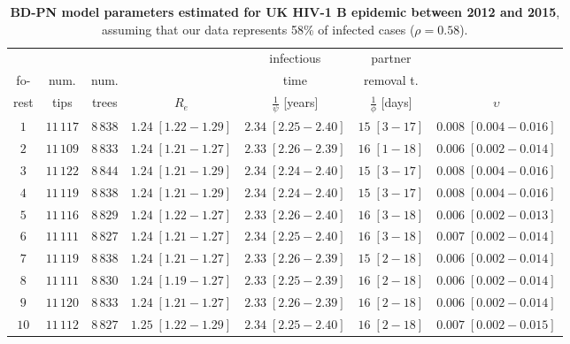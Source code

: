 \documentclass[10pt,letterpaper]{article}
\begin{document}
\begin{table}[!ht]
\begin{adjustwidth}{-0.8in}{0in} %
\centering
\caption{
{\bf BD-PN model parameters estimated for UK HIV-1 B epidemic between 2012 and 2015}, assuming that our data represents 58\% of infected cases ($\rho=0.58$).}

\begin{tabular}{c|cc|cccc}
&&&&infectious&partner&\\
fo-&num.&num.&&time&removal t.&\\
rest&tips&trees&$R_e$&$\frac{1}{\psi}$ [years]& $\frac{1}{\phi}$ [days]&$\upsilon$\\
\toprule
  $1$ & $11\,117$ & $8\,838$ & $1.24\;[1.22-1.29]$& $2.34\;[2.25-2.40]$& $15\;[3-17]$& $0.008\;[0.004-0.016]$ \\
 $2$ & $11\,109$ & $8\,833$ & $1.24\;[1.21-1.27]$& $2.33\;[2.26-2.39]$& $16\;[1-18]$& $0.006\;[0.002-0.014]$ \\
 $3$ & $11\,122$ & $8\,844$ & $1.24\;[1.21-1.29]$& $2.34\;[2.24-2.40]$& $15\;[3-17]$& $0.008\;[0.004-0.016]$ \\
 $4$ & $11\,119$ & $8\,838$ & $1.24\;[1.21-1.29]$& $2.34\;[2.24-2.40]$& $15\;[3-17]$& $0.008\;[0.004-0.016]$ \\
 $5$ & $11\,116$ & $8\,829$ & $1.24\;[1.22-1.27]$& $2.33\;[2.26-2.40]$& $16\;[3-18]$& $0.006\;[0.002-0.013]$ \\
 $6$ & $11\,111$ & $8\,827$ & $1.24\;[1.21-1.27]$& $2.34\;[2.25-2.40]$& $16\;[3-18]$& $0.007\;[0.002-0.014]$ \\
 $7$ & $11\,119$ & $8\,838$ & $1.24\;[1.21-1.27]$& $2.33\;[2.26-2.39]$& $15\;[2-18]$& $0.006\;[0.002-0.014]$ \\
 $8$ & $11\,111$ & $8\,830$ & $1.24\;[1.19-1.27]$& $2.33\;[2.25-2.39]$& $16\;[2-18]$& $0.006\;[0.002-0.014]$ \\
 $9$ & $11\,120$ & $8\,833$ & $1.24\;[1.21-1.27]$& $2.33\;[2.26-2.39]$& $16\;[2-18]$& $0.006\;[0.002-0.014]$ \\
 $10$ & $11\,112$ & $8\,827$ & $1.25\;[1.22-1.29]$& $2.34\;[2.25-2.40]$& $16\;[2-18]$& $0.007\;[0.002-0.015]$ \\
 \bottomrule
 \end{tabular}
\label{tbl:uk}
\end{adjustwidth}
\end{table}
\end{document}
